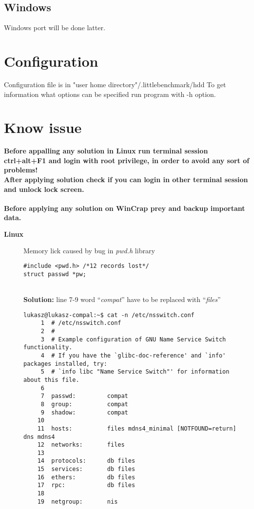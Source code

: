 \documentclass[a4paper]{article}
\begin{document}
\subsection{Windows}
Windows port will be done latter.

\section{Configuration}
Configuration file is in "user home directory"/.littlebenchmark/hdd
To get information what options can be specified run program with -h option.

\newpage
\section{Know issue}
{\bf Before appalling any solution in Linux run terminal session ctrl+alt+F1 and login with root privilege, in order to avoid any sort of problems!\\
After applying solution check if you can login in other terminal session and unlock lock screen.\\ \\
}
{\bf Before applying any solution on WinCrap prey and backup important data.
}
\begin{description}
\item [{\bf Linux}] Memory lick caused by bug in {\itshape pwd.h} library
\begin{verbatim}
#include <pwd.h> /*12 records lost*/
struct passwd *pw;
\end{verbatim}
\\{\bf Solution:} line 7-9 word ``{\itshape compat}'' have to be replaced with ``{\itshape files}''
\begin{verbatim}
lukasz@lukasz-compal:~$ cat -n /etc/nsswitch.conf 
     1	# /etc/nsswitch.conf
     2	#
     3	# Example configuration of GNU Name Service Switch functionality.
     4	# If you have the `glibc-doc-reference' and `info' packages installed, try:
     5	# `info libc "Name Service Switch"' for information about this file.
     6	
     7	passwd:         compat
     8	group:          compat
     9	shadow:         compat
    10	
    11	hosts:          files mdns4_minimal [NOTFOUND=return] dns mdns4
    12	networks:       files
    13	
    14	protocols:      db files
    15	services:       db files
    16	ethers:         db files
    17	rpc:            db files
    18	
    19	netgroup:       nis
\end{verbatim}

\end{description}
\end{document}

